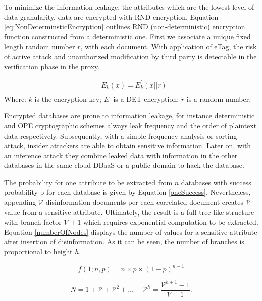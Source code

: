 To minimize the information leakage, the attributes which are the lowest level of data granularity, data are encrypted with RND encryption. Equation \ref{eq:NonDeterminsticEncryption} outlines RND (non-deterministic) encryption function constructed from a deterministic one. First we associate a unique fixed length random number $r$, with each document. With application of eTag, the risk of active attack and unauthorized modification by third party is detectable in the verification phase in the proxy.


\begin{equation}
\label{eq:NonDeterminsticEncryption}
\begin{aligned}
& E_k (x) = E^{\prime}_k (x \left\lvert \right\rvert r) \\ 
\end{aligned}
\end{equation}
Where: $k$ is the encryption key; $E^{\prime}$ is a DET encryption; $r$ is a random number.\\


\medskip

 Encrypted databases are prone to information leakage, for instance deterministic and OPE cryptographic schemes always leak frequency and the order of plaintext data respectively. Subsequently, with a simple frequency analysis or sorting attack, insider attackers are able to obtain sensitive information. Later on, with an inference attack they combine leaked data with information in the other databases in the same cloud DBaaS or a public domain to hack the database.
 
The probability for one attribute to be extracted from $n$ databases with success probability p for each database is given by Equation \ref{oneSuccess}. Nevertheless, appending $\mathcal{V}$ disinformation documents per each correlated document creates $\mathcal{V}$ value from a sensitive attribute. Ultimately, the result is a full tree-like structure with branch factor $\mathcal{V}+1$  which requires exponential computation to be extracted. Equation \ref{numberOfNodes} displays the number of values for a sensitive attribute after insertion of disinformation. As it can be seen, the number of branches is proportional to height $h$.

\begin{equation}
\label{oneSuccess}
f(1;n,p) = n\times p\times(1-p)^{n-1}
\end{equation}

\begin{equation}
\label{numberOfNodes}
N = 1+\mathcal{V}+ \mathcal{V}^2+ \dots + \mathcal{V}^h= \frac{\mathcal{V}^{h+1}-1}{\mathcal{V}-1}.
\end{equation}

